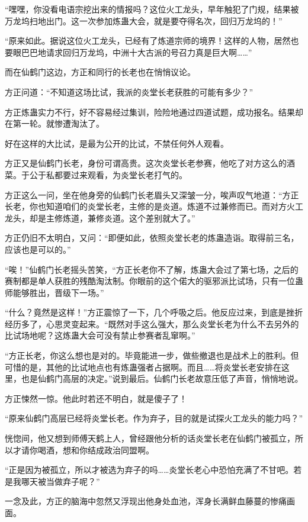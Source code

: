 \begin{this_body}
“嘿嘿，你没看电语宗挖出来的情报吗？这位火工龙头，早年触犯了门规，结果被万龙坞扫地出门。这一次参加炼蛊大会，就是要夺得名次，回归万龙坞的！”

“原来如此。据说这位火工龙头，已经有了炼道宗师的境界！这样的人物，居然也要眼巴巴地请求回归万龙坞，中洲十大古派的号召力真是巨大啊……”

而在仙鹤门这边，方正和同行的长老也在悄悄议论。

方正问道：“不知道这场比试，我派的炎堂长老获胜的可能有多少？”

方正炼蛊实力不行，好不容易经过集训，险险地通过四道试题，成功报名。结果却在第一轮。就惨遭淘汰了。

好在这样的大比试，是最为公开的比试，不禁任何外人观看。

方正又是仙鹤门长老，身份可谓高贵。这次炎堂长老参赛，他吃了对方这么的酒菜。于公于私都要过来观看，为炎堂长老打气的。

方正这么一问，坐在他身旁的仙鹤门长老眉头又深皱一分，唉声叹气地道：“方正长老，你也知道咱们的炎堂长老，主修的是炎道。炼道不过兼修而已。而对方火工龙头，却是主修炼道，兼修炎道。这个差别就大了。”

方正仍旧不太明白，又问：“即便如此，依照炎堂长老的炼蛊造诣。取得前三名，应该也是可以的。”

“唉！”仙鹤门长老摇头苦笑，“方正长老你不了解，炼蛊大会过了第七场，之后的赛制都是单人获胜的残酷淘汰制。你眼前的这个偌大的驱邪派比试场，只有一位蛊师能够胜出，晋级下一场。”

“什么？竟然是这样！”方正震惊了一下，几个呼吸之后。他反应过来，到底是挫折经历多了，心思灵变起来。“既然对手这么强大，那么炎堂长老为什么不去另外的比试场地呢？这炼蛊大会可没有禁止参赛者乱窜啊。”

“方正长老，你这么想也是对的。毕竟能进一步，做些撤退也是战术上的胜利。但可惜的是，其他的比试地点也有炼蛊强者占据啊。而且……将炎堂长老安排在这里，也是仙鹤门高层的决定。”说到最后。仙鹤门长老故意压低了声音，悄悄地说。

方正悚然一惊。他此时若还不明白，就是傻子了！

“原来仙鹤门高层已经将炎堂长老。作为弃子，目的就是试探火工龙头的能力吗？”

恍惚间，他又想到师傅天鹤上人，曾经跟他分析的话炎堂长老在仙鹤门被孤立，所以才请你喝酒，想和你结成政治同盟啊。

“正是因为被孤立，所以才被选为弃子的吗……炎堂长老心中恐怕充满了不甘吧。若是我哪天被当做弃子呢？”

一念及此，方正的脑海中忽然又浮现出他身处血池，浑身长满鲜血藤蔓的惨痛画面。


\end{this_body}
